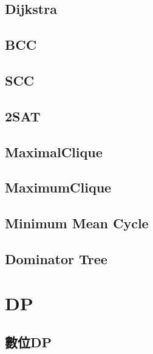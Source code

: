 \subsection{Dijkstra}


\subsection{BCC}


\subsection{SCC}


\subsection{2SAT}


\subsection{MaximalClique}


\subsection{MaximumClique}


\subsection{Minimum Mean Cycle}


\subsection{Dominator Tree}

\section{DP}

\subsection{數位DP}


